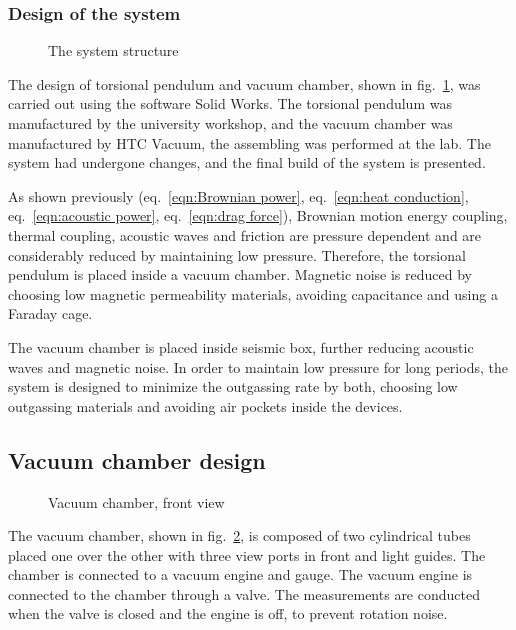 \documentclass[\main/master.tex]{subfiles}
\begin{document}
\subsubsection{Design of the system}
\begin{figure}[htbp]
	\centering
	\caption[Total chamber]{The system structure}
	\label{fig:Total chamber}
\end{figure}
\FloatBarrier
\par\noindent
The design of torsional pendulum and vacuum chamber, shown in fig.~\ref{fig:Total chamber}, was carried out using the software Solid Works. The torsional pendulum was manufactured by the university workshop, and the vacuum chamber was manufactured by HTC Vacuum, the assembling was performed at the lab. The system had undergone changes, and the final build of the system is presented. 
\par\noindent
As shown previously (eq.~\ref{eqn:Brownian power}, eq.~\ref{eqn:heat conduction}, eq.~\ref{eqn:acoustic power}, eq.~\ref{eqn:drag force}), Brownian motion energy coupling, thermal coupling, acoustic waves and friction are pressure dependent and are considerably reduced by maintaining low pressure. Therefore, the torsional pendulum is placed inside a vacuum chamber. Magnetic noise is reduced by choosing low magnetic permeability materials, avoiding capacitance and using a Faraday cage. 
\par\noindent
The vacuum chamber is placed inside seismic box, further reducing acoustic waves and magnetic noise. In order to maintain low pressure for long periods, the system is designed to minimize the outgassing rate by both, choosing low outgassing materials and avoiding air pockets inside the devices. 
\subsection{Vacuum chamber design}
\begin{figure}[htbp]
	\centering
	\caption[Vacuum chamber, front view]{Vacuum chamber, front view}
	\label{fig:chamber front}
\end{figure}
\FloatBarrier

\par\noindent
The vacuum chamber, shown in fig.~\ref{fig:chamber front}, is composed of two cylindrical tubes placed one over the other with three view ports in front and light guides. The chamber is connected to a vacuum engine and gauge. The vacuum engine is connected to the chamber through a valve. The measurements are conducted when the valve is closed and the engine is off, to prevent rotation noise.
\end{document}
